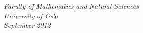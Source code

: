 \documentclass[a4paper]{article}
\begin{document}
\begin{center}
  \vspace{3mm}
  \textsl{Faculty of Mathematics and Natural Sciences} \\
  \textsl{University of Oslo} \\
  \vspace{2mm}
  \large
  \textsl{September 2012} \\
  \normalsize
\end{center}
\end{document}
